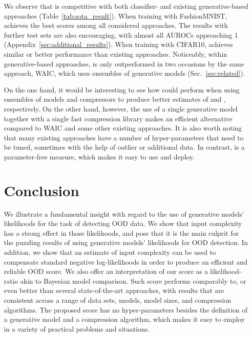 \documentclass[letterpaper]{article} \usepackage{iclr2020_conference,times}
\begin{document}
We observe that  is competitive with both classifier- and existing generative-based approaches (Table~\ref{tab:sota_result}). When training with FashionMNIST,  achieves the best scores among all considered approaches. The results with further test sets are also encouraging, with almost all AUROCs approaching 1 (Appendix~\ref{sec:additional_results}). When training with CIFAR10,  achieves similar or better performance than existing approaches. Noticeably, within generative-based approaches,  is only outperformed in two occasions by the same approach, WAIC, which uses ensembles of generative models (Sec.~\ref{sec:related}). 

On the one hand, it would be interesting to see how  could perform when using ensembles of models and compressors to produce better estimates of  and , respectively. On the other hand, however, the use of a single generative model together with a single fast compression library makes  an efficient alternative compared to WAIC and some other existing approaches. It is also worth noting that many existing approaches have a number of hyper-parameters that need to be tuned, sometimes with the help of outlier or additional data. In contrast,  is a parameter-free measure, which makes it easy to use and deploy.



\section{Conclusion}
\label{sec:conc}

We illustrate a fundamental insight with regard to the use of generative models' likelihoods for the task of detecting OOD data. We show that input complexity has a strong effect in those likelihoods, and pose that it is the main culprit for the puzzling results of using generative models' likelihoods for OOD detection. In addition, we show that an estimate of input complexity can be used to compensate standard negative log-likelihoods in order to produce an efficient and reliable OOD score. We also offer an interpretation of our score as a likelihood-ratio akin to Bayesian model comparison. Such score performs comparably to, or even better than several state-of-the-art approaches, with results that are consistent across a range of data sets, models, model sizes, and compression algorithms. The proposed score has no hyper-parameters besides the definition of a generative model and a compression algorithm, which makes it easy to employ in a variety of practical problems and situations.
\end{document}
